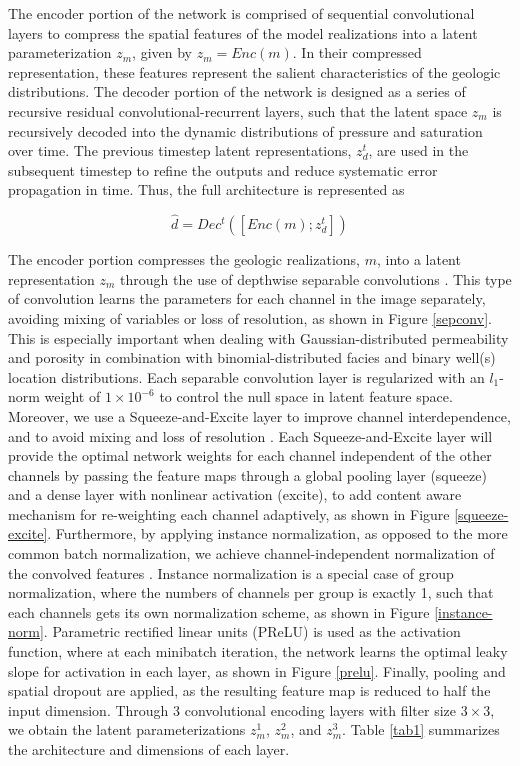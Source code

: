 \documentclass[10pt, twoside]{article}
\begin{document}
The encoder portion of the network is comprised of sequential convolutional layers to compress the spatial features of the model realizations into a latent parameterization $z_m$, given by $z_m=Enc(m)$. In their compressed representation, these features represent the salient characteristics of the geologic distributions. The decoder portion of the network is designed as a series of recursive residual convolutional-recurrent layers, such that the latent space $z_m$ is recursively decoded into the dynamic distributions of pressure and saturation over time. The previous timestep latent representations, $z_d^t$, are used in the subsequent timestep to refine the outputs and reduce systematic error propagation in time. Thus, the full architecture is represented as

\begin{equation} \label{eq6}
    \hat{d} = Dec^t ( [ Enc(m) ; z_d^t ] )
\end{equation}

The encoder portion compresses the geologic realizations, $m$, into a latent representation $z_m$ through the use of depthwise separable convolutions \cite{chollet2017xception}. This type of convolution learns the parameters for each channel in the image separately, avoiding mixing of variables or loss of resolution, as shown in Figure \ref{sepconv}. This is especially important when dealing with Gaussian-distributed permeability and porosity in combination with binomial-distributed facies and binary well(s) location distributions. Each separable convolution layer is regularized with an $l_1$-norm weight of $1\times10^{-6}$ to control the null space in latent feature space. Moreover, we use a Squeeze-and-Excite layer to improve channel interdependence, and to avoid mixing and loss of resolution \cite{hu2018squeeze}. Each Squeeze-and-Excite layer will provide the optimal network weights for each channel independent of the other channels by passing the feature maps through a global pooling layer (squeeze) and a dense layer with nonlinear activation (excite), to add content aware mechanism for re-weighting each channel adaptively, as shown in Figure \ref{squeeze-excite}. Furthermore, by applying instance normalization, as opposed to the more common batch normalization, we achieve channel-independent normalization of the convolved features \cite{ulyanov2016instance}. Instance normalization is a special case of group normalization, where the numbers of channels per group is exactly 1, such that each channels gets its own normalization scheme, as shown in Figure \ref{instance-norm}. Parametric rectified linear units (PReLU) is used as the activation function, where at each minibatch iteration, the network learns the optimal leaky slope for activation in each layer, as shown in Figure \ref{prelu}. Finally, pooling and spatial dropout are applied, as the resulting feature map is reduced to half the input dimension. Through 3 convolutional encoding layers with filter size $3\times3$, we obtain the latent parameterizations $z_m^1$, $z_m^2$, and $z_m^3$. Table \ref{tab1} summarizes the architecture and dimensions of each layer.
\end{document}
